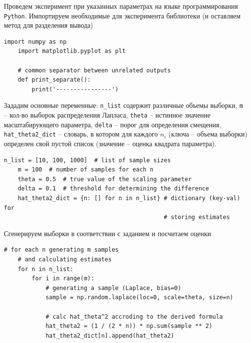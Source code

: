 \documentclass[a4paper, 12pt]{article}
\begin{document}
    Проведем эксперимент при указанных параметрах на языке программирования \texttt{Python}. Импортируем необходимые для эксперимента библиотеки (и оставляем метод для разделения вывода)
    \begin{lstlisting}[label=import2, caption={Импортирование библиотек для эксперимента}]
    import numpy as np
    import matplotlib.pyplot as plt

    # common separator between unrelated outputs
    def print_separate():
        print('----------------')
    \end{lstlisting}


    Зададим основные переменные: \texttt{n\_{list}} содержит различные объемы выборки, \texttt{m} -- кол-во выборок распределения Лапласа,
    \texttt{theta} -- истинное значение масштабирующего параметра, \texttt{delta} -- порог для определения смещения, \texttt{hat\_theta2\_dict}
    -- словарь, в котором для каждого $n_i$ (ключа -- объема выборки) определен свой пустой список (значение -- оценка квадрата параметра). 
    \begin{lstlisting}[label=main_variables, caption={Определение основных переменных в программе}]
    n_list = [10, 100, 1000]  # list of sample sizes
    m = 100  # number of samples for each n
    theta = 0.5  # true value of the scaling parameter
    delta = 0.1  # threshold for determining the difference
    hat_theta2_dict = {n: [] for n in n_list} # dictionary (key-val) for
                                              # storing estimates
    \end{lstlisting}


    Сгенерируем выборки в соответствии с заданием и посчитаем оценки
    \begin{lstlisting}[label=gen_calc, caption={Код для генерации выборок и подсчета оценок выведенной формулой}]
    # for each n generating m samples 
    # and calculating estimates
    for n in n_list:
        for i in range(m):
            # generating a sample (Laplace, bias=0)
            sample = np.random.laplace(loc=0, scale=theta, size=n)
                
            # calc hat_theta^2 accroding to the derived formula
            hat_theta2 = (1 / (2 * n)) * np.sum(sample ** 2)
            hat_theta2_dict[n].append(hat_theta2)
    \end{lstlisting}
\end{document}

